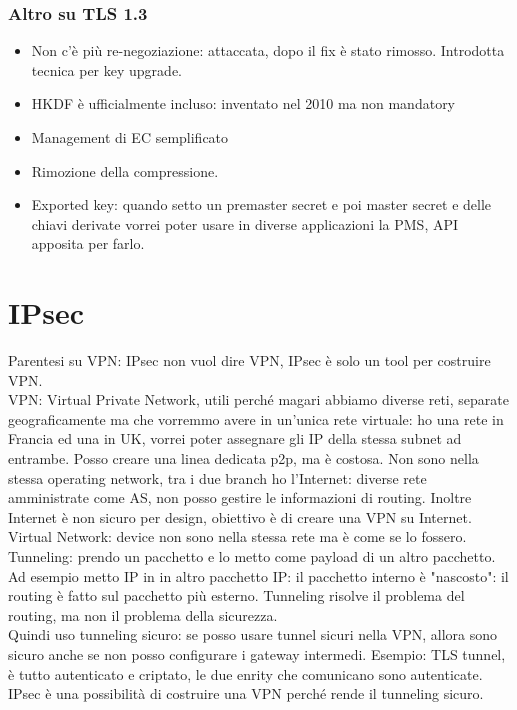 \documentclass[16px]{article}
\begin{document}
\subsubsection{Altro su TLS 1.3}
\begin{itemize}
\item Non c'è più re-negoziazione: attaccata, dopo il fix è stato rimosso. Introdotta tecnica per key upgrade.
\item HKDF è ufficialmente incluso: inventato nel 2010 ma non mandatory
\item Management di EC semplificato
\item Rimozione della compressione.
\item Exported key: quando setto un premaster secret e poi master secret e delle chiavi derivate vorrei poter usare in diverse applicazioni la PMS, API apposita per farlo.
\end{itemize}
\section{IPsec}
Parentesi su VPN: IPsec non vuol dire VPN, IPsec è solo un tool per costruire VPN.\\ VPN: Virtual Private Network, utili perché magari abbiamo diverse reti, separate geograficamente ma che vorremmo avere in un'unica rete virtuale: ho una rete in Francia ed una in UK, vorrei poter assegnare gli IP della stessa subnet ad entrambe. Posso creare una linea dedicata p2p, ma è costosa. Non sono nella stessa operating network, tra i due branch ho l'Internet: diverse rete amministrate come AS, non posso gestire le informazioni di routing. Inoltre Internet è non sicuro per design, obiettivo è di creare una VPN su Internet.\\ Virtual Network: device non sono nella stessa rete ma è come se lo fossero. Tunneling: prendo un pacchetto e lo metto come payload di un altro pacchetto. Ad esempio metto IP in in altro pacchetto IP: il pacchetto interno è "nascosto": il routing è fatto sul pacchetto più esterno. Tunneling risolve il problema del routing, ma non il problema della sicurezza.\\ Quindi uso tunneling sicuro: se posso usare tunnel sicuri nella VPN, allora sono sicuro anche se non posso configurare i gateway intermedi. Esempio: TLS tunnel, è tutto autenticato e criptato, le due enrity che comunicano sono autenticate.\\ IPsec è una possibilità di costruire una VPN perché rende il tunneling sicuro.
\end{document}
